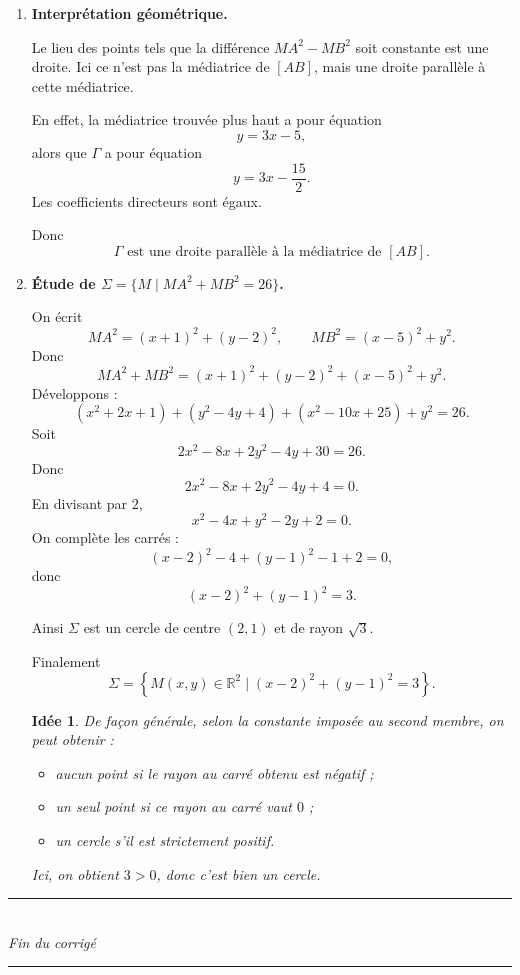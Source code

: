 \documentclass[11pt,a4paper]{article}
\newcommand{\R}{\mathbb{R}}
\newtheorem*{idee}{Idée}
\begin{document}
\begin{enumerate}[label=\textbf{\arabic*.}]
    Ainsi
    \[
    \boxed{\Gamma \text{ est la droite d'équation } 6x-2y=15.}
    \]

    \item \textbf{Interprétation géométrique.}

    Le lieu des points tels que la différence \(MA^2-MB^2\) soit constante est une droite.  
    Ici ce n'est pas la médiatrice de \([AB]\), mais une droite parallèle à cette médiatrice.

    En effet, la médiatrice trouvée plus haut a pour équation
    \[
    y=3x-5,
    \]
    alors que \(\Gamma\) a pour équation
    \[
    y=3x-\frac{15}{2}.
    \]
    Les coefficients directeurs sont égaux.

    Donc
    \[
    \boxed{\Gamma \text{ est une droite parallèle à la médiatrice de }[AB].}
    \]

    \item \textbf{Étude de \(\Sigma=\{M\mid MA^2+MB^2=26\}\).}

    On écrit
    \[
    MA^2=(x+1)^2+(y-2)^2,\qquad MB^2=(x-5)^2+y^2.
    \]
    Donc
    \[
    MA^2+MB^2=(x+1)^2+(y-2)^2+(x-5)^2+y^2.
    \]
    Développons :
    \[
    (x^2+2x+1)+(y^2-4y+4)+(x^2-10x+25)+y^2=26.
    \]
    Soit
    \[
    2x^2-8x+2y^2-4y+30=26.
    \]
    Donc
    \[
    2x^2-8x+2y^2-4y+4=0.
    \]
    En divisant par \(2\),
    \[
    x^2-4x+y^2-2y+2=0.
    \]
    On complète les carrés :
    \[
    (x-2)^2-4+(y-1)^2-1+2=0,
    \]
    donc
    \[
    (x-2)^2+(y-1)^2=3.
    \]

    Ainsi \(\Sigma\) est un cercle de centre \((2,1)\) et de rayon \(\sqrt3\).

    Finalement
    \[
    \boxed{\Sigma=\left\{M(x,y)\in\R^2\mid (x-2)^2+(y-1)^2=3\right\}.}
    \]

    \begin{idee}
    De façon générale, selon la constante imposée au second membre, on peut obtenir :
    \begin{itemize}
        \item aucun point si le rayon au carré obtenu est négatif ;
        \item un seul point si ce rayon au carré vaut \(0\) ;
        \item un cercle s'il est strictement positif.
    \end{itemize}
    Ici, on obtient \(3>0\), donc c'est bien un cercle.
    \end{idee}
\end{enumerate}

\vspace{1.2em}

\begin{center}
    \rule{0.65\textwidth}{0.5pt}\\[0.4em]
    \textit{Fin du corrigé}\\[0.2em]
    \rule{0.65\textwidth}{0.5pt}
\end{center}
\end{document}
